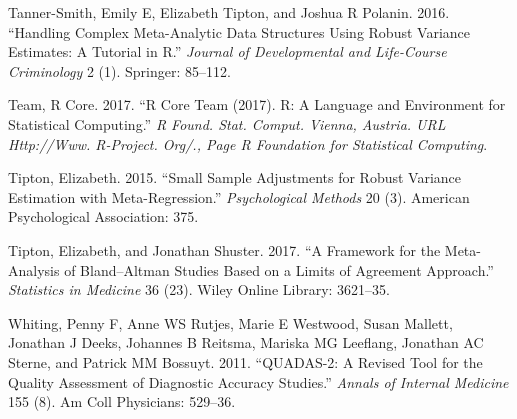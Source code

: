 \documentclass[smallextended]{svjour3}       %
\begin{document}
\leavevmode\hypertarget{ref-tanner2016handling}{}%
Tanner-Smith, Emily E, Elizabeth Tipton, and Joshua R Polanin. 2016.
``Handling Complex Meta-Analytic Data Structures Using Robust Variance
Estimates: A Tutorial in R.'' \emph{Journal of Developmental and
Life-Course Criminology} 2 (1). Springer: 85--112.

\leavevmode\hypertarget{ref-team2017r}{}%
Team, R Core. 2017. ``R Core Team (2017). R: A Language and Environment
for Statistical Computing.'' \emph{R Found. Stat. Comput. Vienna,
Austria. URL Http://Www. R-Project. Org/., Page R Foundation for
Statistical Computing}.

\leavevmode\hypertarget{ref-tipton2015small}{}%
Tipton, Elizabeth. 2015. ``Small Sample Adjustments for Robust Variance
Estimation with Meta-Regression.'' \emph{Psychological Methods} 20 (3).
American Psychological Association: 375.

\leavevmode\hypertarget{ref-tipton2017framework}{}%
Tipton, Elizabeth, and Jonathan Shuster. 2017. ``A Framework for the
Meta-Analysis of Bland--Altman Studies Based on a Limits of Agreement
Approach.'' \emph{Statistics in Medicine} 36 (23). Wiley Online Library:
3621--35.

\leavevmode\hypertarget{ref-whiting2011quadas}{}%
Whiting, Penny F, Anne WS Rutjes, Marie E Westwood, Susan Mallett,
Jonathan J Deeks, Johannes B Reitsma, Mariska MG Leeflang, Jonathan AC
Sterne, and Patrick MM Bossuyt. 2011. ``QUADAS-2: A Revised Tool for the
Quality Assessment of Diagnostic Accuracy Studies.'' \emph{Annals of
Internal Medicine} 155 (8). Am Coll Physicians: 529--36.



\end{document}
